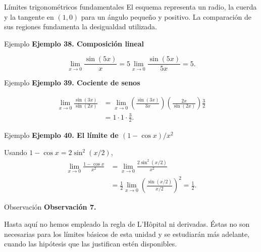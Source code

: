 \documentclass[12pt,aspectratio=169]{beamer}
\begin{document}
\begin{frame}[t,allowframebreaks]{Límites trigonométricos fundamentales}
El esquema representa un radio, la cuerda y la tangente en $(1,0)$ para un ángulo pequeño y positivo. La comparación de sus regiones fundamenta la desigualdad utilizada.
\end{frame}


\begin{frame}[t,allowframebreaks]{Ejemplo}
{\color{azul}\bfseries Ejemplo 38. Composición lineal}\par\medskip

\[
 \lim_{x\to0}\frac{\sin(5x)}{x}=
 5\lim_{x\to0}\frac{\sin(5x)}{5x}=\boxed{5}.
\]
\end{frame}


\begin{frame}[t,allowframebreaks]{Ejemplo}
{\color{azul}\bfseries Ejemplo 39. Cociente de senos}\par\medskip

\begin{align*}
\lim_{x\to0}\frac{\sin(3x)}{\sin(2x)}
 &=\lim_{x\to0}\left(\frac{\sin(3x)}{3x}\right)
 \left(\frac{2x}{\sin(2x)}\right)\frac32\\
 &=1\cdot1\cdot\boxed{\frac32}.
\end{align*}
\end{frame}


\begin{frame}[t,allowframebreaks]{Ejemplo}
{\color{azul}\bfseries Ejemplo 40. El límite de $(1-\cos x)/x^2$}\par\medskip

Usando $1-\cos x=2\sin^2(x/2)$,
\begin{align*}
 \lim_{x\to0}\frac{1-\cos x}{x^2}
 &=\lim_{x\to0}\frac{2\sin^2(x/2)}{x^2}\\
 &=\frac12\lim_{x\to0}\left(\frac{\sin(x/2)}{x/2}\right)^2
 =\boxed{\frac12}.
\end{align*}
\end{frame}


\begin{frame}[t,allowframebreaks]{Observación}
{\color{azul}\bfseries Observación 7.}\par\medskip

Hasta aquí no hemos empleado la regla de L'Hôpital ni derivadas. Éstas no son necesarias para los límites básicos de esta unidad y se estudiarán más adelante, cuando las hipótesis que las justifican estén disponibles.
\end{frame}
\end{document}
